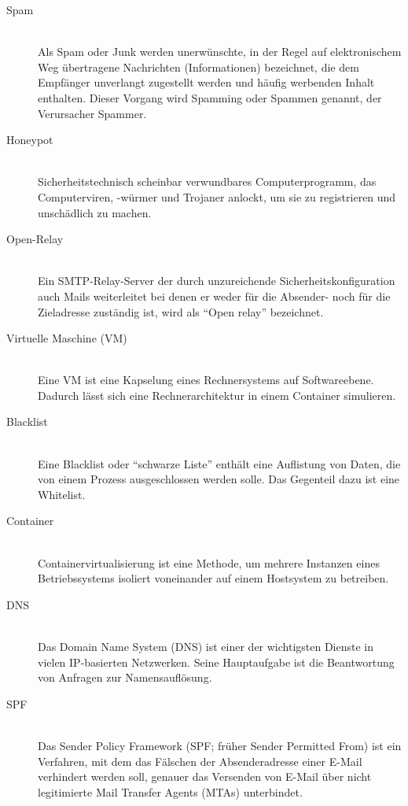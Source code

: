 \documentclass[a4paper,11pt,singlespacing]{article}
\begin{document}
	\begin{description}
	\item[Spam\label{itm:Spam}]\hfill \\
		Als Spam oder Junk werden unerwünschte, in der Regel auf elektronischem Weg übertragene Nachrichten (Informationen) bezeichnet, die dem Empfänger unverlangt zugestellt werden und häufig werbenden Inhalt enthalten. Dieser Vorgang wird Spamming oder Spammen genannt, der Verursacher Spammer.\cite{Spam}
	\item[Honeypot\label{itm:Honeypot}]\hfill \\
		Sicherheitstechnisch scheinbar verwundbares Computerprogramm, das Computerviren, -würmer und Trojaner anlockt, um sie zu registrieren und unschädlich zu machen.\cite{Honeypot}
	\item[Open-Relay\label{itm:OpenRelay}]\hfill \\
		Ein SMTP-Relay-Server der durch unzureichende Sicherheitskonfiguration auch Mails weiterleitet bei denen er weder für die Absender- noch für die Zieladresse zuständig ist, wird als "`Open relay"' bezeichnet.\cite{SMTP-Relay-Server}
	\item[Virtuelle Maschine (VM)\label{itm:VirtuelleMaschine}]\hfill \\
		Eine VM ist eine Kapselung eines Rechnersystems auf Softwareebene. Dadurch lässt sich eine Rechnerarchitektur in einem Container simulieren. \cite{VM}
	\item[Blacklist \label{itm:Blacklist}]\hfill \\
		Eine Blacklist oder "`schwarze Liste"' enthält eine Auflistung von Daten, die von einem Prozess ausgeschlossen werden solle. Das Gegenteil dazu ist eine Whitelist. \cite{Blacklist}
	\item[Container\label{itm:Container}]\hfill \\
		Containervirtualisierung ist eine Methode, um mehrere Instanzen eines Betriebssystems isoliert voneinander auf einem Hostsystem zu betreiben.\cite{Container}
	\item[DNS\label{itm:DNS}]\hfill \\
		Das Domain Name System (DNS) ist einer der wichtigsten Dienste in vielen IP-basierten Netzwerken. Seine Hauptaufgabe ist die Beantwortung von Anfragen zur Namensauflösung.\cite{DNS}
	\item[SPF\label{itm:SPF}]\hfill \\
		Das Sender Policy Framework (SPF; früher Sender Permitted From) ist ein Verfahren, mit dem das Fälschen der Absenderadresse einer E-Mail verhindert werden soll, genauer das Versenden von E-Mail über nicht legitimierte Mail Transfer Agents (MTAs) unterbindet.\cite{SPF}

\end{description}
\end{document}
